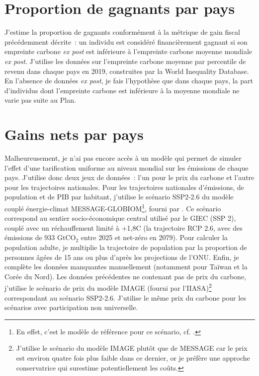 \documentclass[a5paper,french,openany]{memoir}
\begin{document}
\section{Proportion de gagnants par pays}

J'estime la proportion de gagnants conformément à la métrique de gain fiscal précédemment décrite~: un individu est considéré financièrement gagnant si son empreinte carbone \textit{ex post} est inférieure à l'empreinte carbone moyenne mondiale \textit{ex post}. J'utilise les données sur l'empreinte carbone moyenne par percentile de revenu dans chaque pays en 2019, construites par la World Inequality Database. En l'absence de données \textit{ex post}, je fais l'hypothèse que dans chaque pays, la part d'individus dont l'empreinte carbone est inférieure à la moyenne mondiale ne varie pas suite au Plan.

\section{Gains nets par pays}\label{app:pays} 

Malheureusement, je n'ai pas encore accès à un modèle qui permet de simuler l'effet d'une tarification uniforme au niveau mondial sur les émissions de chaque pays. J'utilise donc deux jeux de données~: l'un pour le prix du carbone et l'autre pour les trajectoires nationales. Pour les trajectoires nationales d'émissions, de population et de PIB par habitant, j'utilise le scénario SSP2-2.6 du modèle couplé énergie-climat MESSAGE-GLOBIOM\footnote{En effet, c'est le modèle de référence pour ce scénario, cf. \cite{fricko_marker_2017}.}, fourni par \cite{gutschow_country-resolved_2021}. Ce scénario correspond au sentier socio-économique central utilisé par le GIEC (SSP 2), couplé avec un réchauffement limité à +1,8\textdegree{}C (la trajectoire RCP 2.6, avec des émissions de 933 GtCO$_\text{2}$ entre 2025 et net-zéro en 2079). Pour calculer la population adulte, je multiplie la trajectoire de population par la proportion de personnes âgées de 15 ans ou plus d'après les projections de l'ONU. Enfin, je complète les données manquantes manuellement (notamment pour Taïwan et la Corée du Nord). Les données précédentes ne contenant pas de prix du carbone, j'utilise le scénario de prix du modèle IMAGE (fourni par l'IIASA)\footnote{J'utilise le scénario du modèle IMAGE plutôt que de MESSAGE car le prix est environ quatre fois plus faible dans ce dernier, or je préfère une approche conservatrice qui surestime potentiellement les coûts. 
} correspondant au scénario SSP2-2.6. J'utilise le même prix du carbone pour les scénarios avec participation non universelle. 
\end{document}
